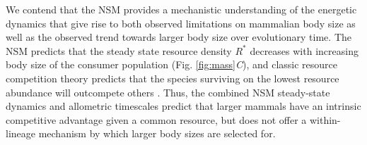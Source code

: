 \documentclass{pnastwo}
\begin{document}
\begin{article}



We contend that the NSM provides a mechanistic understanding of the energetic dynamics that give rise to both observed limitations on mammalian body size as well as the observed trend towards larger body size over evolutionary time.
The NSM predicts that the steady state resource density $R^{*}$ decreases with increasing body size of the consumer population (Fig. \ref{fig:mass}\emph{C}), and classic resource competition theory predicts that the species surviving on the lowest resource abundance will outcompete others \cite{tilman1981,dutkiewicz2009,barton2010}. Thus, the combined NSM steady-state dynamics and allometric timescales predict that larger mammals have an intrinsic competitive advantage given a common resource, but does not offer a within-lineage mechanism by which larger body sizes are selected for.


\end{article}
\end{document}

